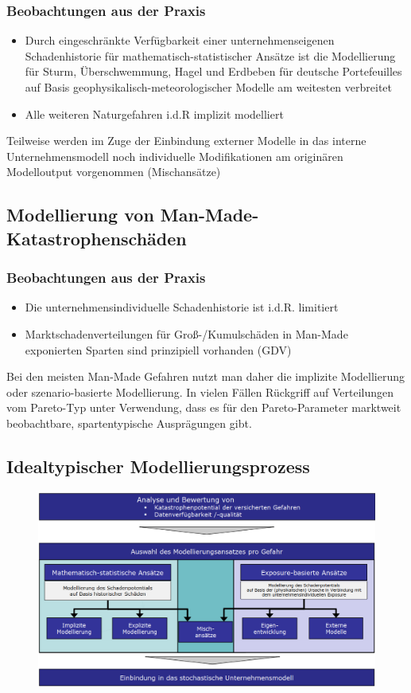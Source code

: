\documentclass[12pt]{report}
\theoremstyle{dotless}
\theoremstyle{definition}
\begin{document}
\subsubsection{Beobachtungen aus der Praxis}
\begin{itemize}
\item Durch eingeschränkte Verfügbarkeit einer unternehmenseigenen Schadenhistorie für mathematisch-statistischer Ansätze ist die Modellierung für Sturm, Überschwemmung, Hagel und Erdbeben für deutsche Portefeuilles auf
Basis geophysikalisch-meteorologischer Modelle am weitesten verbreitet
\item Alle weiteren Naturgefahren i.d.R implizit modelliert
\end{itemize}
Teilweise werden im Zuge der Einbindung externer Modelle in das interne Unternehmensmodell noch individuelle Modifikationen am originären Modelloutput vorgenommen (Mischansätze)

\subsection{Modellierung von Man-Made-Katastrophenschäden}

\subsubsection{Beobachtungen aus der Praxis}
\begin{itemize}
\item Die unternehmensindividuelle Schadenhistorie ist i.d.R. limitiert
\item Marktschadenverteilungen für Groß-/Kumulschäden in Man-Made exponierten Sparten sind prinzipiell vorhanden (GDV)
\end{itemize}
Bei den meisten Man-Made Gefahren nutzt man daher die implizite Modellierung oder szenario-basierte Modellierung. In vielen Fällen Rückgriff auf Verteilungen vom Pareto-Typ unter Verwendung, dass es für den
Pareto-Parameter marktweit beobachtbare, spartentypische Ausprägungen gibt.

\subsection{Idealtypischer Modellierungsprozess}

\begin{figure}[ht]
	\centering
	\includegraphics[width= \textwidth]{Bilder/Modellierungsprozess.png}
\end{figure}
\end{document}
